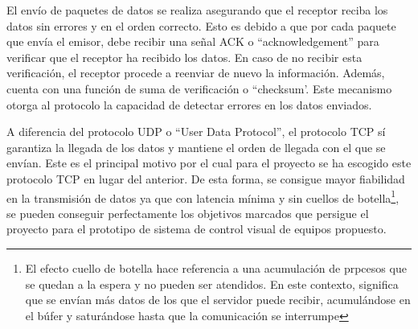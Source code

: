 El envío de paquetes de datos se realiza asegurando que el receptor reciba los datos sin errores y en el orden correcto.  Esto es debido a que por cada paquete que envía el emisor, debe recibir una señal ACK o ``acknowledgement'' para verificar que el receptor ha recibido los datos. En caso de no recibir esta verificación, el receptor procede a reenviar de nuevo la información. Además, cuenta con una función de suma de verificación o ``checksum'. Este mecanismo otorga al protocolo la capacidad de detectar errores en los datos enviados.

A diferencia del protocolo UDP o ``User Data Protocol'', el protocolo TCP sí garantiza la llegada de los datos y mantiene el orden de llegada con el que se envían.
Este es el principal motivo por el cual para el proyecto se ha escogido este protocolo TCP en lugar del anterior. De esta forma, se consigue mayor fiabilidad en la transmisión de datos ya que con latencia mínima y sin cuellos de botella\footnote{El efecto cuello de botella hace referencia a una acumulación de prpcesos que se quedan a la espera y no pueden ser atendidos. En este contexto, significa que se envían más datos de los que el servidor puede recibir, acumulándose en el búfer y saturándose hasta que la comunicación se interrumpe}, se pueden conseguir perfectamente los objetivos marcados que persigue el proyecto para el prototipo de sistema de control visual de equipos propuesto.\par


